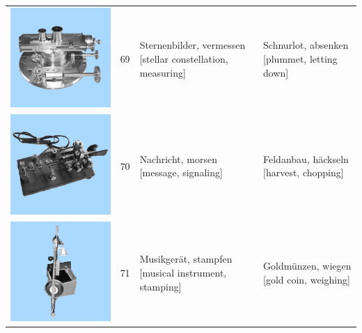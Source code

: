 \documentclass[
  english,
  doc,12pt,twoside,floatsintext]{apa7}
\begin{document}
\begin{center}
\begin{ThreePartTable}
{\begin{longtable}{llll}
\includegraphics[valign=c, scale=0.23]{../materials/unfamiliar/69.png} & 69 & \makecell[l]{Sternenbilder, vermessen\\{[stellar constellation, measuring]}} & \makecell[l]{Schnurlot, absenken\\{[plummet, letting down]}}\\
\includegraphics[valign=c, scale=0.23]{../materials/unfamiliar/70.png} & 70 & \makecell[l]{Nachricht, morsen\\{[message, signaling]}} & \makecell[l]{Feldanbau, häckseln\\{[harvest, chopping]}}\\
\includegraphics[valign=c, scale=0.23]{../materials/unfamiliar/71.png} & 71 & \makecell[l]{Musikgerät, stampfen\\{[musical instrument, stamping]}} & \makecell[l]{Goldmünzen, wiegen\\{[gold coin, weighing]}}\\

\end{longtable}}
\end{ThreePartTable}
\end{center}
\end{document}
